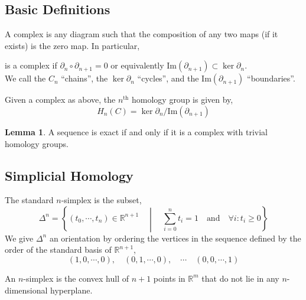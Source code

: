 \documentclass[12pt]{extarticle}
\newcommand{\R}{\mathbb{R}}
\renewcommand{\Im}[1]{\mathrm{Im}(#1)}
\theoremstyle{definition}
\newtheorem{lemma}[theorem]{Lemma}
\newenvironment{definition}[1][Definition:]{\begin{trivlist}
\item[\hskip \labelsep {\bfseries #1}]}{\end{trivlist}}
\begin{document}
\subsection{Basic Definitions}

\begin{definition}
A complex is any diagram such that the composition of any two maps (if it exists) is the zero map. In particular,
\begin{center}
\end{center}
is a complex if $\partial_{n} \circ \partial_{n + 1} = 0$ or equivalently $\Im{\partial_{n+1}} \subset \ker{\partial_n}$. \bigskip\\
We call the $C_n$ ``chains'', the $\ker{\partial_n}$ ``cycles'', and the $\Im{\partial_{n+1}}$ ``boundaries''. 
\end{definition} 

\begin{definition}
Given a complex as above, the $n^{\mathrm{th}}$ homology group is given by,
\[ H_n(C) = \ker{\partial_n} / \Im{\partial_{n+1}} \]
\end{definition}

\begin{lemma}
A sequence is exact if and only if it is a complex with trivial homology groups.
\end{lemma}

\subsection{Simplicial Homology}

\begin{definition}
The standard $n$-simplex is the subset,
\[\Delta^n = \left\{ (t_0, \cdots, t_n) \in \R^{n+1} \quad \middle| \quad \sum_{i = 0}^n t_i = 1 \quad \text{and} \quad \forall i : t_i \ge 0 \right\} \] 
We give $\Delta^n$ an orientation by ordering the vertices in the sequence defined by the order of the standard basis of $\R^{n+1}$,
\[(1,0, \cdots, 0), \quad (0,1,\cdots,0), \quad \cdots \quad (0, 0, \cdots, 1)\]
\end{definition}

\begin{definition}
An $n$-simplex is the convex hull of $n + 1$ points in $\R^m$ that do not lie in any $n$-dimensional hyperplane. 
\end{definition}
\end{document}
